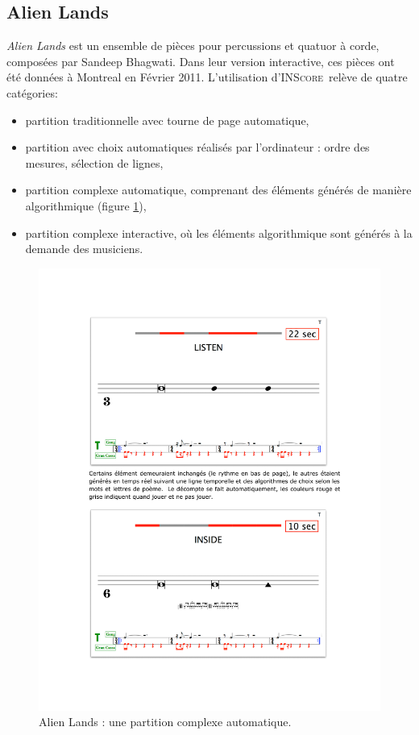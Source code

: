 \documentclass{article}
\newcommand{\inscore}		{\textsc{\small INScore}}
\begin{document}
\subsection{Alien Lands}

\textit{Alien Lands} est un ensemble de pièces pour percussions et quatuor à corde, composées par Sandeep Bhagwati. Dans leur version interactive, ces pièces ont été données à Montreal en Février 2011.
L'utilisation d'\inscore\ relève de quatre catégories:
\begin{itemize}
\item partition traditionnelle avec tourne de page automatique,
\item partition avec choix automatiques réalisés par l'ordinateur : ordre des mesures, sélection de lignes,
\item partition complexe automatique, comprenant des éléments générés de manière algorithmique (figure \ref{fig:al}),
\item partition complexe interactive, où les éléments algorithmique sont générés à la demande des musiciens.
\end{itemize}

\begin{figure}[htbp]
\centerline{
	\includegraphics[width=0.94\columnwidth]{imgs/alienscore}}
\caption{Alien Lands : une partition complexe automatique.}
\label{fig:al}
\end{figure}
\end{document}
